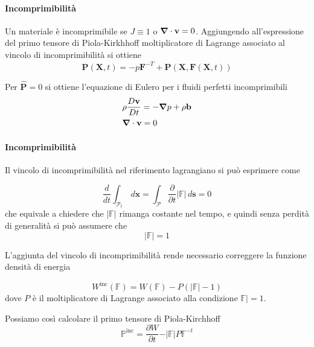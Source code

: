 \paragraph{Incomprimibilità}
Un materiale è incomprimibile se $J\equiv 1$ o $\boldsymbol{\nabla}\cdot\mathbf{v}=0$.
Aggiungendo all'espressione del primo tensore di Piola-Kirkhhoff moltiplicatore di Lagrange associato al vincolo di incomprimibilità si ottiene
\begin{equation*}
\mathbf{P}(\mathbf{X},t)=-p\mathbf{F}^{-T}+\widehat{\mathbf{P}}(\mathbf{X},\mathbf{F}(\mathbf{X},t))
\end{equation*}

Per $\widehat{\mathbf{P}}=0$  si ottiene l'equazione di Eulero per i fluidi perfetti incomprimibili
\begin{align*}
&\rho\frac{D \mathbf{v}}{Dt} = -\boldsymbol{\nabla} p+\rho\mathbf{b} \\
&\boldsymbol{\nabla}\cdot\mathbf{v}=0
\end{align*}

%
\paragraph{Incomprimibilità}

Il vincolo di incomprimibilità nel riferimento lagrangiano si può esprimere come

\begin{equation*}
\frac{d}{dt}\int_{\mathcal{P}_t}\,d\mathbf{x} = \int_{\mathcal{P}}\frac{\partial}{\partial t}\vert\mathbb{F}\vert\,d\mathbf{s} = 0
\end{equation*}
che equivale a chiedere che $\vert\mathbb{F}\vert$ rimanga costante nel tempo, e quindi senza perdità di generalità si può assumere che 
\begin{equation*}
\vert \mathbb{F} \vert = 1
\end{equation*}

L'aggiunta del vincolo di incomprimibilità rende necessario correggere la funzione densità di energia

\begin{equation*}
W^{\text{inc}}(\mathbb{F}) = W(\mathbb{F})-P(\vert\mathbb{F}\vert - 1)
\end{equation*}
dove $P$ è il moltiplicatore di Lagrange associato alla condizione $\mathbb{F}\vert=1$.

Possiamo così calcolare il primo tensore di Piola-Kirchhoff
\begin{equation*}
\mathbb{P}^{\text{inc}}=\frac{\partial W}{\partial t}-\vert\mathbb{F}\vert P\mathbb{F}^{-t}
\end{equation*}


